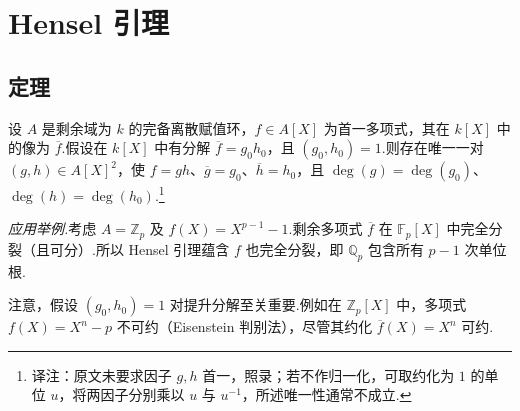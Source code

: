 \section{Hensel 引理}\label{sec:nt-4-3}
\subsection{定理}\label{sec:nt-4-3-1}
\begin{theorem*}
设 $A$ 是剩余域为 $k$ 的完备离散赋值环，$f\in A[X]$ 为首一多项式，其在 $k[X]$ 中的像为 $\overline f$.假设在 $k[X]$ 中有分解 $\overline f=g_0h_0$，且 $(g_0,h_0)=1$.则存在唯一一对 $(g,h)\in A[X]^2$，使 $f=gh$、$\overline g=g_0$、$\overline h=h_0$，且 $\deg(g)=\deg(g_0)$、$\deg(h)=\deg(h_0)$.\footnote{译注：原文未要求因子 $g,h$ 首一，照录；若不作归一化，可取约化为 $1$ 的单位 $u$，将两因子分别乘以 $u$ 与 $u^{-1}$，所述唯一性通常不成立.}
\end{theorem*}
\emph{应用举例.}考虑 $A=\mathbb Z_p$ 及 $f(X)=X^{p-1}-1$.剩余多项式 $\overline f$ 在 $\mathbb F_p[X]$ 中完全分裂（且可分）.所以 Hensel 引理蕴含 $f$ 也完全分裂，即 $\mathbb Q_p$ 包含所有 $p-1$ 次单位根.
\begin{remark*}
注意，假设 $(g_0,h_0)=1$ 对提升分解至关重要.例如在 $\mathbb Z_p[X]$ 中，多项式 $f(X)=X^n-p$ 不可约（Eisenstein 判别法），尽管其约化 $\overline f(X)=X^n$ 可约.
\end{remark*}
